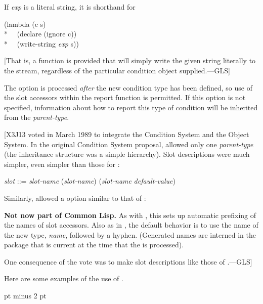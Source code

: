 \begin{defmac}
\begin{flushdesc}
     If \emph{exp} is a literal string, it is shorthand for
\begin{lisp}
(lambda (c s) \\*
~~(declare (ignore c)) \\*
~~(write-string \emph{exp} s))
\end{lisp}
     [That is, a function is provided that will simply write the given string literally
     to the stream, regardless of the particular condition object supplied.---GLS]

     The  option is processed \emph{after} the new condition type has been defined,
     so use of the slot accessors within the report function is permitted.
     If this option is not specified, information about how to report this
     type of condition will be inherited from the \emph{parent-type}.
\end{flushdesc}

[X3J13 voted in March 1989  to integrate the
Condition System and the Object System.
In the original Condition System proposal, 
allowed only one \emph{parent-type} (the inheritance structure was a simple
hierarchy).
Slot descriptions were much simpler, even simpler than those for :
\begin{tabbing}
\emph{slot} ::= \emph{slot-name} {\Mor} (\emph{slot-name}) {\Mor} (\emph{slot-name} \emph{default-value})
\end{tabbing}
Similarly,  allowed
a  option similar to that of :
\begin{flushdesc}
\item[\cd{(:conc-name \emph{symbol-or-string})}]

     {\bf Not now part of Common Lisp.}
     As with , this sets up automatic prefixing of the names 
     of slot accessors. Also as in , the default behavior 
     is to use the name of the new type, \emph{name}, followed by a hyphen.
     (Generated names are interned in the package that is current at the time that the 
      is processed).
\end{flushdesc}
One consequence of the vote was to make  slot descriptions
like those of .---GLS]

Here are some examples of the use of .

 pt minus 2 pt


\end{defmac}
